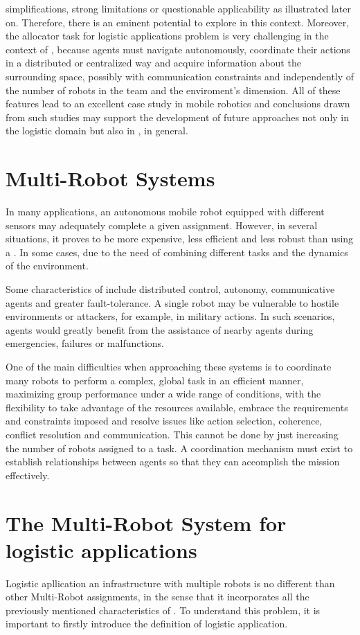 simplifications, strong limitations or questionable applicability as illustrated later
on. Therefore, there is an eminent potential to explore in this context.
\newline
Moreover, the allocator task for logistic applications problem is very challenging
in the context of \mrs, because agents must navigate autonomously,
coordinate their actions in a distributed or centralized way and acquire information
about the surrounding space, possibly with communication constraints and independently
of the number of robots in the team and the enviroment's dimension.
All of these features lead to an excellent case study in mobile robotics
and conclusions drawn from such studies may support the development of future
approaches not only in the logistic domain but also in \mrs, in
general.

\section{Multi-Robot Systems}
In many applications, an autonomous mobile robot equipped with different
sensors may adequately complete a given assignment. However, in several situations,
it proves to be more expensive, less efficient and less robust than using a \mrs.
In some cases, due to the need of combining different tasks and the dynamics of the environment.

Some characteristics of \mrs include distributed control, autonomy,
communicative agents and greater fault-tolerance.
A single robot may be vulnerable to hostile environments or attackers, for example, in military actions.
In such scenarios, agents would greatly benefit from the assistance of nearby agents during emergencies,
failures or malfunctions.

One of the main difficulties when approaching these systems is to coordinate
many robots to perform a complex, global task in an efficient manner, maximizing
group performance under a wide range of conditions, with the flexibility to take
advantage of the resources available, embrace the requirements and constraints
imposed and resolve issues like action selection, coherence, conflict resolution and
communication. This cannot be done by just increasing the number of robots
assigned to a task.
A coordination mechanism must exist to establish relationships between agents so
that they can accomplish the mission effectively.

\section{The Multi-Robot System for logistic applications}
Logistic apllication an infrastructure with multiple robots is no different than other Multi-Robot
assignments, in the sense that it incorporates all the previously mentioned
characteristics of \mrs. To understand this problem, it is important to firstly
introduce the definition of logistic application.


